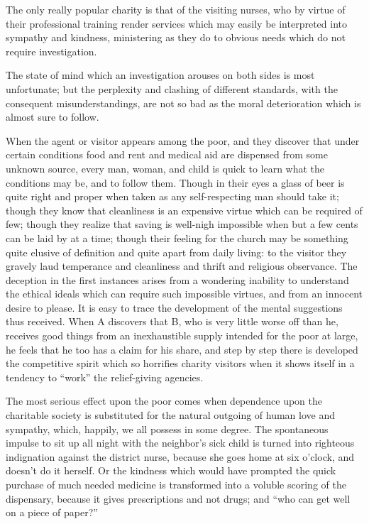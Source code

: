 \documentclass[]{article}
\begin{document}
\begin{sectionbody}
\addamsparagraph The only really popular charity is that of the visiting nurses, who by
virtue of their professional training render services which may easily
be interpreted into sympathy and kindness, ministering as they do to
obvious needs which do not require investigation.

\addamsparagraph The state of mind which an investigation arouses on both sides is most
unfortunate; but the perplexity and clashing of different standards,
with the consequent misunderstandings, are not so bad as the moral
deterioration which is almost sure to follow.

\addamsparagraph When the agent or visitor appears among the poor, and they discover that
under certain conditions food and rent and medical aid are dispensed
from some unknown source, every man, woman, and child is quick to learn
what the conditions may be, and to follow them. Though in their eyes a
glass of beer is quite right and proper when taken as any
self-respecting man should take it; though they know that cleanliness is
an expensive virtue which can be required of few; though they realize
that saving is well-nigh impossible when but a few cents can be laid by
at a time; though their feeling for the church may be something quite
elusive of definition and quite apart from daily living: to the visitor
they gravely laud temperance and cleanliness and thrift and religious
observance. The deception in the first instances arises from a wondering
inability to understand the ethical ideals which can require such
impossible virtues, and from an innocent desire to please. It is easy to
trace the development of the mental suggestions thus received. When A
discovers that B, who is very little worse off than he, receives good
things from an inexhaustible supply intended for the poor at large, he
feels that he too has a claim for his share, and step by step there is
developed the competitive spirit which so horrifies charity visitors
when it shows itself in a tendency to ``work'' the relief-giving agencies.

\addamsparagraph The most serious effect upon the poor comes when dependence upon the
charitable society is substituted for the natural outgoing of human love
and sympathy, which, happily, we all possess in some degree. The
spontaneous impulse to sit up all night with the neighbor's sick child
is turned into righteous indignation against the district nurse,
because she goes home at six o'clock, and doesn't do it herself. Or the
kindness which would have prompted the quick purchase of much needed
medicine is transformed into a voluble scoring of the dispensary,
because it gives prescriptions and not drugs; and ``who can get well on a
piece of paper?''


\end{sectionbody}
\end{document}
